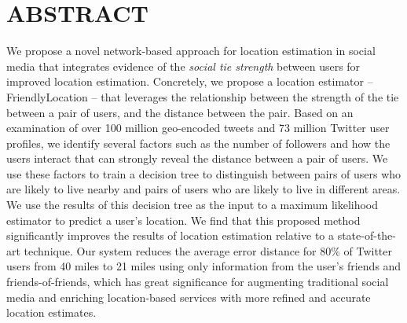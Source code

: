 %
%
%

\chapter*{ABSTRACT}

\pagestyle{plain} %
\setcounter{page}{2}

\indent We propose a novel network-based approach for location estimation in social
media that integrates evidence of the \textit{social tie strength} between
users for improved location estimation.
%
Concretely, we propose a location
estimator -- FriendlyLocation -- that leverages the relationship between the
strength of the tie between a pair of users, and the distance between the pair.
%
Based on an examination of over 100 million geo-encoded tweets and 73 million
Twitter user profiles, we identify several factors such as the
number of followers and how the users interact that can strongly reveal the
distance between a pair of users.
%
We use these factors to train a decision
tree to distinguish between pairs of users who are likely to live nearby and pairs of
users who are likely to live in different areas.
%
We use the results of this decision tree as the input to a maximum likelihood
estimator to predict a user's location.
We find that this proposed method significantly improves the results of
location estimation relative to a state-of-the-art technique.
Our system reduces the average error distance for 80\% of Twitter users from 40
miles to 21 miles using only information from the user's friends and
friends-of-friends,  which has great significance for augmenting traditional
social media and enriching location-based services with more refined and
accurate location estimates.

\pagebreak{}
